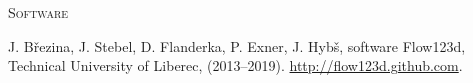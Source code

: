 \documentclass[bibliography=totocnumbered,dvipsnames,FM,Dis,EN]{tulthesis}
\begin{document}
\vspace{0.5cm}
%
{\noindent\large\textsc{Software}}
\begin{itemize}[label={}, leftmargin=*]
{\small
\item
J. B{\v r}ezina, J. Stebel, D. Flanderka, P. Exner, J. Hyb{\v s}, software Flow123d, 
Technical University of Liberec, (2013--2019).
\url{http://flow123d.github.com}.
}
\end{itemize}
%





{\small

% 

}
\end{document}
